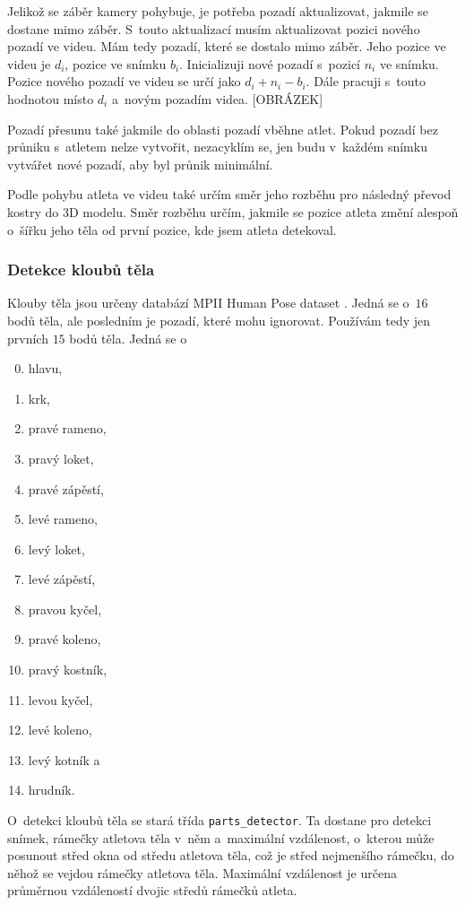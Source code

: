 Jelikož se záběr kamery pohybuje, je potřeba pozadí aktualizovat, jakmile se dostane mimo záběr. S~touto aktualizací musím aktualizovat pozici nového pozadí ve videu. Mám tedy pozadí, které se dostalo mimo záběr. Jeho pozice ve videu je $d_i$, pozice ve snímku $b_i$. Inicializuji nové pozadí s~pozicí $n_i$ ve snímku. Pozice nového pozadí ve videu se určí jako $d_i+n_i-b_i$. Dále pracuji s~touto hodnotou místo $d_i$ a~novým pozadím videa. [OBRÁZEK]

Pozadí přesunu také jakmile do oblasti pozadí vběhne atlet. Pokud pozadí bez průniku s~atletem nelze vytvořit, nezacyklím se, jen budu v~každém snímku vytvářet nové pozadí, aby byl průnik minimální.

Podle pohybu atleta ve videu také určím směr jeho rozběhu pro následný převod kostry do 3D modelu. Směr rozběhu určím, jakmile se pozice atleta změní alespoň o~šířku jeho těla od první pozice, kde jsem atleta detekoval.


\subsubsection{Detekce kloubů těla}

Klouby těla jsou určeny databází MPII Human Pose dataset \citep{MPIIHPE}. Jedná se o~$16$ bodů těla, ale posledním je pozadí, které mohu ignorovat. Používám tedy jen prvních $15$ bodů těla. Jedná se o
\begin{enumerate}
\setcounter{enumi}{-1}
\item hlavu,
\item krk,
\item pravé rameno,
\item pravý loket,
\item pravé zápěstí,
\item levé rameno,
\item levý loket,
\item levé zápěstí,
\item pravou kyčel,
\item pravé koleno,
\item pravý kostník,
\item levou kyčel,
\item levé koleno,
\item levý kotník a
\item hrudník.
\end{enumerate}

O~detekci kloubů těla se stará třída \texttt{parts\_detector}. Ta dostane pro detekci snímek, rámečky atletova těla v~něm a~maximální vzdálenost, o~kterou může posunout střed okna od středu atletova těla, což je střed nejmenšího rámečku, do něhož se vejdou rámečky atletova těla. Maximální vzdálenost je určena průměrnou vzdáleností dvojic středů rámečků atleta.

